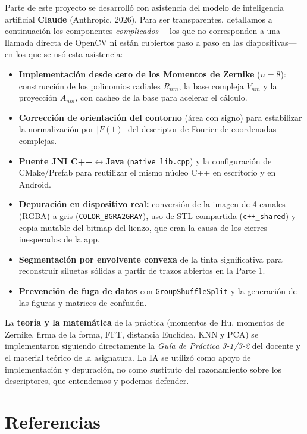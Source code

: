 \documentclass[12pt,a4paper]{article}
\begin{document}
Parte de este proyecto se desarrolló con asistencia del modelo de inteligencia artificial \textbf{Claude} (Anthropic, 2026). Para ser transparentes, detallamos a continuación los componentes \textit{complicados} —los que no corresponden a una llamada directa de OpenCV ni están cubiertos paso a paso en las diapositivas— en los que se usó esta asistencia:

\begin{itemize}
  \item \textbf{Implementación desde cero de los Momentos de Zernike} ($n=8$): construcción de los polinomios radiales $R_{nm}$, la base compleja $V_{nm}$ y la proyección $A_{nm}$, con cacheo de la base para acelerar el cálculo.
  \item \textbf{Corrección de orientación del contorno} (área con signo) para estabilizar la normalización por $|F(1)|$ del descriptor de Fourier de coordenadas complejas.
  \item \textbf{Puente JNI C++$\leftrightarrow$Java} (\texttt{native\_lib.cpp}) y la configuración de CMake/Prefab para reutilizar el mismo núcleo C++ en escritorio y en Android.
  \item \textbf{Depuración en dispositivo real:} conversión de la imagen de 4 canales (RGBA) a gris (\texttt{COLOR\_BGRA2GRAY}), uso de STL compartida (\texttt{c++\_shared}) y copia mutable del bitmap del lienzo, que eran la causa de los cierres inesperados de la app.
  \item \textbf{Segmentación por envolvente convexa} de la tinta significativa para reconstruir siluetas sólidas a partir de trazos abiertos en la Parte 1.
  \item \textbf{Prevención de fuga de datos} con \texttt{GroupShuffleSplit} y la generación de las figuras y matrices de confusión.
\end{itemize}

La \textbf{teoría y la matemática} de la práctica (momentos de Hu, momentos de Zernike, firma de la forma, FFT, distancia Euclídea, KNN y PCA) se implementaron siguiendo directamente la \textit{Guía de Práctica 3-1/3-2} del docente y el material teórico de la asignatura. La IA se utilizó como apoyo de implementación y depuración, no como sustituto del razonamiento sobre los descriptores, que entendemos y podemos defender.

\section*{Referencias}
\end{document}

